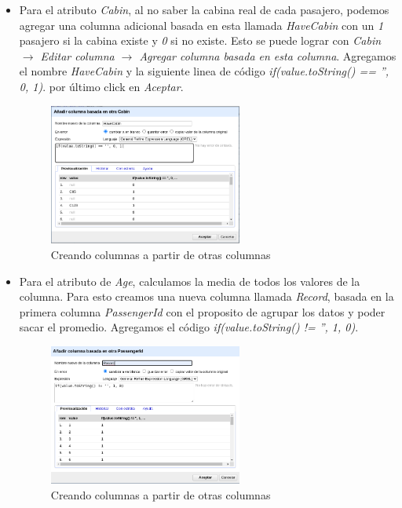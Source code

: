 \documentclass[12pt]{article}
\begin{document}
\begin{itemize}
                    \item Para el atributo \textit{Cabin}, al no saber la cabina real de cada pasajero, podemos agregar una columna adicional basada en esta llamada \textit{HaveCabin} con un \textit{1} pasajero si la cabina existe y \textit{0} si no existe. Esto se puede lograr con \textit{Cabin $\rightarrow$ Editar columna $\rightarrow$ Agregar columna basada en esta columna}. Agregamos el nombre \textit{HaveCabin} y la siguiente linea de código \textit{if(value.toString() == '', 0, 1)}. por último click en \textit{Aceptar}.
                        \newpage
                        \begin{figure}[!h]
                            \centering
                            \includegraphics[width=0.6\textwidth]{img/openrefine-15.png}
                            \caption{Creando columnas a partir de otras columnas}
                        \end{figure}
                    
                    \item Para el atributo de \textit{Age}, calculamos la media de todos los valores de la columna. Para esto creamos una nueva columna llamada \textit{Record}, basada en la primera columna \textit{PassengerId} con el proposito de agrupar los datos y poder sacar el promedio. Agregamos el código \textit{if(value.toString() != '', 1, 0)}.
                        \begin{figure}[!h]
                            \centering
                            \includegraphics[width=0.6\textwidth]{img/openrefine-16.png}
                            \caption{Creando columnas a partir de otras columnas}
                        \end{figure}
                    

\end{itemize}
\end{document}
